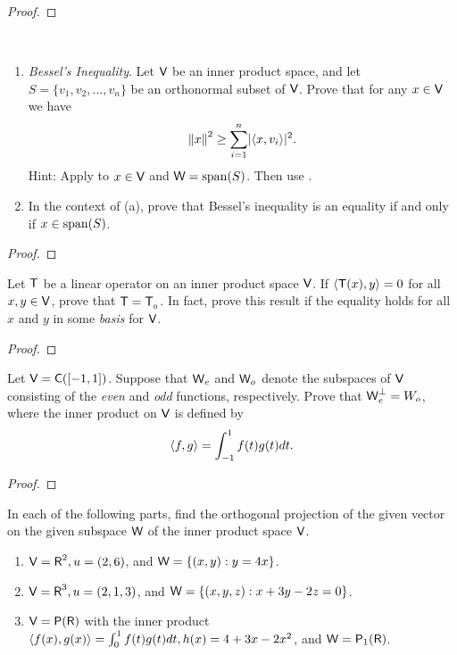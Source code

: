 \begin{proof}
\end{proof}

\begin{exercise} \label{exercise 6.2.16} \ 

\begin{enumerate}
\item \emph{Bessel's Inequality}.
Let \(\textsf{V}\) be an inner product space, and let \(S = \{ v_1, v_2, ..., v_n \}\) be an orthonormal subset of \(\textsf{V}\).
Prove that for any \(x \in \textsf{V}\) we have
\[
    \left\lVert x\right\rVert^2 \ge \sum_{i = 1}^n \lvert\left< x, v_i \right>\rvert^2.
\]
Hint: Apply  to \(x \in \textsf{V}\) and \(\textsf{W} = \operatorname{span}(S)\).
Then use .
\item In the context of (a), prove that Bessel's inequality is an equality if and only if \(x \in \operatorname{span}(S)\).
\end{enumerate}
\end{exercise}

\begin{proof}
\end{proof}

\begin{exercise} \label{exercise 6.2.17}
Let \(\textsf{T}\) be a linear operator on an inner product space \(\textsf{V}\).
If \(\left< \textsf{T}(x), y \right> = 0\) for all \(x, y \in \textsf{V}\), prove that \(\textsf{T} = \textsf{T}_{_0}\).
In fact, prove this result if the equality holds for all \(x\) and \(y\) in some \emph{basis} for \(\textsf{V}\).
\end{exercise}

\begin{proof}
\end{proof}

\begin{exercise} \label{exercise 6.2.18}
Let \(\textsf{V} = \textsf{C}([-1, 1])\).
Suppose that \(\textsf{W}_e\) and \(\textsf{W}_o\) denote the subspaces of \(\textsf{V}\) consisting of the \emph{even} and \emph{odd} functions, respectively.
Prove that \(\textsf{W}_e^{\perp} = W_o\), where the inner product on \(\textsf{V}\) is defined by
\[
    \left< f, g \right> = \int_{-1}^1 f(t) g(t) dt.
\]
\end{exercise}

\begin{proof}
\end{proof}

\begin{exercise} \label{exercise 6.2.19}
In each of the following parts, find the orthogonal projection of the given vector on the given subspace \(\textsf{W}\) of the inner product space \(\textsf{V}\).
\begin{enumerate}
\item \(\textsf{V} = \textsf{R}^2, u = (2, 6)\), and \(\textsf{W} = \{ (x, y): y = 4x \}\).
\item \(\textsf{V} = \textsf{R}^3, u = (2, 1, 3)\), and \(\textsf{W} = \{ (x, y, z): x + 3y - 2z = 0 \}\).
\item \(\textsf{V} = \textsf{P}(\textsf{R})\) with the inner product \(\left< f(x), g(x) \right> = \int_0^1 f(t) g(t) dt, h(x) = 4 + 3x - 2x^2\), and \(\textsf{W} = \textsf{P}_1(\textsf{R})\).
\end{enumerate}
\end{exercise}

